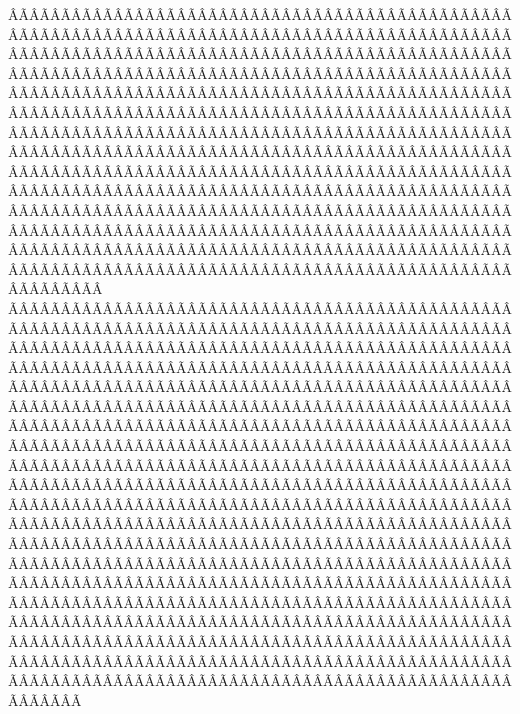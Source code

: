 \begin{sumilla}
\begin{fundamentacion}
ÂÃÂÃÂÃÂÃÂÃÂÃÂÃÂÃÂÃÂÃÂÃÂÃÂÃÂÃÂÃÂÃÂÃÂÃÂÃÂÃÂÃÂÃÂÃÂÃÂÃÂÃÂÃÂÃÂÃÂÃÂÃÂÃÂÃÂÃÂÃÂÃÂÃÂÃÂÃÂÃÂÃÂÃÂÃÂÃÂÃÂÃÂÃÂÃÂÃÂÃÂÃÂÃÂÃÂÃÂÃÂÃÂÃÂÃÂÃÂÃÂÃÂÃÂÃÂÃÂÃÂÃÂÃÂÃÂÃÂÃÂÃÂÃÂÃÂÃÂÃÂÃÂÃÂÃÂÃÂÃÂÃÂÃÂÃÂÃÂÃÂÃÂÃÂÃÂÃÂÃÂÃÂÃÂÃÂÃÂÃÂÃÂÃÂÃÂÃÂÃÂÃÂÃÂÃÂÃÂÃÂÃÂÃÂÃÂÃÂÃÂÃÂÃÂÃÂÃÂÃÂÃÂÃÂÃÂÃÂÃÂÃÂÃÂÃÂÃÂÃÂÃÂÃÂÃÂÃÂÃÂÃÂÃÂÃÂÃÂÃÂÃÂÃÂÃÂÃÂÃÂÃÂÃÂÃÂÃÂÃÂÃÂÃÂÃÂÃÂÃÂÃÂÃÂÃÂÃÂÃÂÃÂÃÂÃÂÃÂÃÂÃÂÃÂÃÂÃÂÃÂÃÂÃÂÃÂÃÂÃÂÃÂÃÂÃÂÃÂÃÂÃÂÃÂÃÂÃÂÃÂÃÂÃÂÃÂÃÂÃÂÃÂÃÂÃÂÃÂÃÂÃÂÃÂÃÂÃÂÃÂÃÂÃÂÃÂÃÂÃÂÃÂÃÂÃÂÃÂÃÂÃÂÃÂÃÂÃÂÃÂÃÂÃÂÃÂÃÂÃÂÃÂÃÂÃÂÃÂÃÂÃÂÃÂÃÂÃÂÃÂÃÂÃÂÃÂÃÂÃÂÃÂÃÂÃÂÃÂÃÂÃÂÃÂÃÂÃÂÃÂÃÂÃÂÃÂÃÂÃÂÃÂÃÂÃÂÃÂÃÂÃÂÃÂÃÂÃÂÃÂÃÂÃÂÃÂÃÂÃÂÃÂÃÂÃÂÃÂÃÂÃÂÃÂÃÂÃÂÃÂÃÂÃÂÃÂÃÂÃÂÃÂÃÂÃÂÃÂÃÂÃÂÃÂÃÂÃÂÃÂÃÂÃÂÃÂÃÂÃÂÃÂÃÂÃÂÃÂÃÂÃÂÃÂÃÂÃÂÃÂÃÂÃÂÃÂÃÂÃÂÃÂÃÂÃÂÃÂÃÂÃÂÃÂÃÂÃÂÃÂÃÂÃÂÃÂÃÂÃÂÃÂÃÂÃÂÃÂÃÂÃÂÃÂÃÂÃÂÃÂÃÂÃÂÃÂÃÂÃÂÃÂÃÂÃÂÃÂÃÂÃÂÃÂÃÂÃÂÃÂÃÂÃÂÃÂÃÂÃÂÃÂÃÂÃÂÃÂÃÂÃÂÃÂÃÂÃÂÃÂÃÂÃÂÃÂÃÂÃÂÃÂÃÂÃÂÃÂÃÂÃÂÃÂÃÂÃÂÃÂÃÂÃÂÃÂÃÂÃÂÃÂÃÂÃÂÃÂÃÂÃÂÃÂÃÂÃÂÃÂÃÂÃÂÃÂÃÂÃÂÃÂÃÂÃÂÃÂÃÂÃÂÃÂÃÂÃÂÃÂÃÂÃÂÃÂÃÂÃÂÃÂÃÂÃÂÃÂÃÂÃÂÃÂÃÂÃÂÃÂÃÂÃÂÃÂÃÂÃÂÃÂÃÂÃÂÃÂÃÂÃÂÃÂÃÂÃÂÃÂÃÂÃÂÃÂÃÂÃÂÃÂÃÂÃÂÃÂÃÂÃÂÃÂÃÂÃÂÃÂÃÂÃÂÃÂÃÂÃÂÃÂÃÂÃÂÃÂÃÂÃÂÃÂÃÂÃÂÃÂÃÂÃÂÃÂÃÂÃÂÃÂÃÂÃÂÃÂÃÂÃÂÃÂÃÂÃÂÃÂÃÂÃÂÃÂÃÂÃÂÃÂÃÂÃÂÃÂÃÂÃÂÃÂÃÂÃÂÃÂÃÂÃÂÃÂÃÂÃÂÃÂÃÂÃÂÃÂÃÂÃÂÃÂÃÂÃÂÃÂÃÂÃÂÃÂÃÂÃÂÃÂÃÂÃÂÃÂÃÂÃÂÃÂÃÂÃÂÃÂÃÂÃÂÃÂÃÂÃÂÃÂÃÂÃÂÃÂÃÂÃÂÃÂÃÂÃÂÃÂÃÂÃÂÃÂÃÂÃÂÃÂÃÂÃÂÃÂÃÂÃÂÃÂÃÂÃÂÃÂÃÂÃÂÃÂÃÂÃÂÃÂÃÂÃÂÃÂÃÂÃÂÃÂÃÂÃÂÃÂÃÂÃÂÃÂÃÂÃÂÃÂÃÂÃÂÃÂÃÂÃÂÃÂÃÂÃÂÃÂÃÂÃÂÃÂÃÂÃÂÃÂÃÂÃÂÃÂÃÂÃÂÃÂÃÂÃÂÃÂÃÂÃÂÃÂÃÂÃÂÃÂÃÂÃÂÃÂÃÂÃÂÃÂÃÂÃÂÃÂÃÂÃÂÃÂÃÂÃÂÃÂÃÂÃÂÃÂÃÂÃÂÃÂÃÂÃÂÃÂÃÂÃÂÃÂÃÂÃÂÃÂÃÂÃÂÃÂÃÂÃÂÃÂÃÂÃÂÃÂÃÂÃÂÃÂÃÂÃÂÃÂÃÂÃÂÃÂÃÂÃÂÃÂÃÂÃÂÃÂÃÂÃÂÃÂÃÂÃÂÃÂÃÂÃÂÃÂÃÂÃÂÃÂÃÂÃÂÃÂÃÂÃÂÃÂÃÂÃÂÃÂÃÂÃÂÃÂÃÂÃÂÃÂÃÂÃÂÃÂÃÂÃÂÃÂÃÂÃÂÃÂÃÂÃÂÃÂÃÂÃÂÃÂÃÂÃÂÃÂÃÂÃÂÃÂÃÂÃÂÃÂÃÂÃÂÃÂÃÂÃÂÃÂÃÂÃÂÃÂÃÂÃÂÃÂÃÂÃÂÃÂÃÂÃÂÃÂÃÂÃÂÃÂÃÂÃÂÃÂÃÂÃÂÃÂÃÂÃÂÃÂÃÂÃÂÃÂÃÂÃÂÃÂÃÂÃÂÃÂÃÂÃÂÃÂÃÂÃÂÃÂÃÂÃÂÃÂÃÂÃÂÃÂÃÂÃÂÃÂÃÂÃÂÃÂÃÂÃÂÃÂÃÂÃÂÃÂÃÂÃÂÃÂÃÂÃÂÃÂÃÂÃÂÃÂÃÂÃÂÃÂÃÂÃÂÃÂÃÂÃÂÃÂÃÂÃÂÃÂÃÂÃÂÃÂÃÂÃÂÃÂÃÂÃÂÃÂÃÂÃÂÃÂÃÂÃÂÃÂÃÂÃÂÃÂÃÂÃÂÃÂÃÂÃÂÃÂÃÂÃÂÃÂÃÂÃ
\end{fundamentacion}
\end{sumilla}
